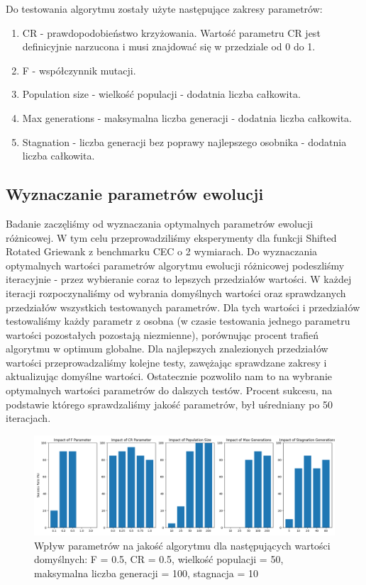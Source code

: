 \documentclass{article}
\begin{document}
Do testowania algorytmu zostały użyte następujące zakresy parametrów:

\begin{enumerate}
    \item CR - prawdopodobieństwo krzyżowania. Wartość parametru CR jest definicyjnie narzucona i musi znajdować się w przedziale od 0 do 1.
    \item F - współczynnik mutacji.
    \item Population size - wielkość populacji - dodatnia liczba całkowita.
    \item Max generations - maksymalna liczba generacji - dodatnia liczba całkowita.
    \item Stagnation - liczba generacji bez poprawy najlepszego osobnika - dodatnia liczba całkowita.
\end{enumerate}

\subsection{Wyznaczanie parametrów ewolucji}

Badanie zaczęliśmy od wyznaczania optymalnych parametrów ewolucji różnicowej. W tym celu przeprowadziliśmy eksperymenty dla funkcji Shifted Rotated Griewank z benchmarku CEC o 2 wymiarach. Do wyznaczania optymalnych wartości parametrów algorytmu ewolucji różnicowej podeszliśmy iteracyjnie - przez wybieranie coraz to lepszych przedziałów wartości. W każdej iteracji rozpoczynaliśmy od wybrania domyślnych wartości oraz sprawdzanych przedziałów wszystkich testowanych parametrów. Dla tych wartości i przedziałów testowaliśmy każdy parametr z osobna (w czasie testowania jednego parametru wartości pozostałych pozostają niezmienne), porównując procent trafień algorytmu w optimum globalne. Dla najlepszych znalezionych przedziałów wartości przeprowadzaliśmy kolejne testy, zawężając sprawdzane zakresy i aktualizując domyślne wartości. Ostatecznie pozwoliło nam to na wybranie optymalnych wartości parametrów do dalszych testów. Procent sukcesu, na podstawie którego sprawdzaliśmy jakość parametrów, był uśredniany po 50 iteracjach. 

\begin{figure}[H]
    \centering
    \includegraphics[width=\textwidth]{parameter_tuning_results_separate1.png}
    \caption{Wpływ parametrów na jakość algorytmu dla następujących wartości domyślnych: F = 0.5, CR = 0.5, wielkość populacji = 50, maksymalna liczba generacji = 100, stagnacja = 10}
    \label{fig:parameter_results1}
\end{figure}
\end{document}
